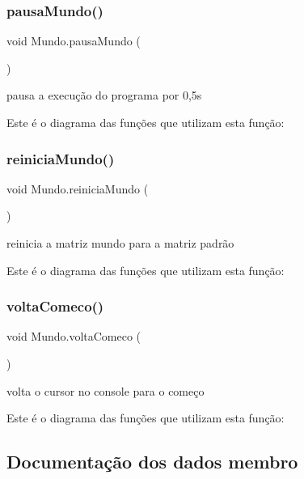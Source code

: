 \subsubsection{\texorpdfstring{pausa\+Mundo()}{pausaMundo()}}
{\footnotesize\ttfamily void Mundo.\+pausa\+Mundo (\begin{DoxyParamCaption}{ }\end{DoxyParamCaption})}



pausa a execução do programa por 0,5s 

Este é o diagrama das funções que utilizam esta função\+:
\mbox{\label{class_mundo_a6e10fa6c3ae633a67e2ba897d83ab951}} 
\subsubsection{\texorpdfstring{reinicia\+Mundo()}{reiniciaMundo()}}
{\footnotesize\ttfamily void Mundo.\+reinicia\+Mundo (\begin{DoxyParamCaption}{ }\end{DoxyParamCaption})}



reinicia a matriz mundo para a matriz padrão 

Este é o diagrama das funções que utilizam esta função\+:
\mbox{\label{class_mundo_a546c0413297120b08815afafcc0e7d32}} 
\subsubsection{\texorpdfstring{volta\+Comeco()}{voltaComeco()}}
{\footnotesize\ttfamily void Mundo.\+volta\+Comeco (\begin{DoxyParamCaption}{ }\end{DoxyParamCaption})}



volta o cursor no console para o começo 

Este é o diagrama das funções que utilizam esta função\+:


\subsection{Documentação dos dados membro}
\mbox{\label{class_mundo_a689dcc4a20afc97fc8a63907ab682d7e}} 
